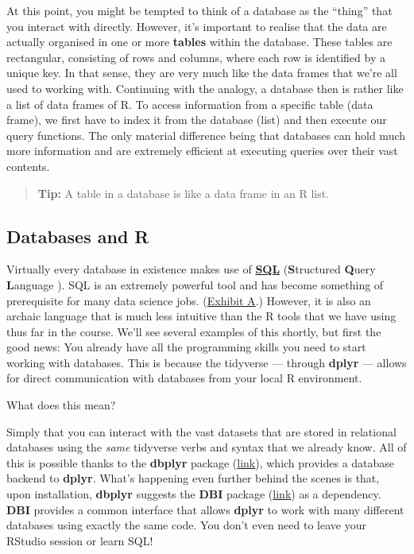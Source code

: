 \documentclass[
]{article}
\begin{document}
At this point, you might be tempted to think of a database as the
``thing'' that you interact with directly. However, it's important to
realise that the data are actually organised in one or more
\textbf{tables} within the database. These tables are rectangular,
consisting of rows and columns, where each row is identified by a unique
key. In that sense, they are very much like the data frames that we're
all used to working with. Continuing with the analogy, a database then
is rather like a list of data frames of R. To access information from a
specific table (data frame), we first have to index it from the database
(list) and then execute our query functions. The only material
difference being that databases can hold much more information and are
extremely efficient at executing queries over their vast contents.

\begin{quote}
\textbf{Tip:} A table in a database is like a data frame in an R list.
\end{quote}

\hypertarget{databases-and-r}{%
\subsection{Databases and R}\label{databases-and-r}}

Virtually every database in existence makes use of
\href{https://en.wikipedia.org/wiki/SQL}{\textbf{SQL}}
(\textbf{S}tructured \textbf{Q}uery \textbf{L}anguage ). SQL is an
extremely powerful tool and has become something of prerequisite for
many data science jobs.
(\href{https://raw.githack.com/uo-ec607/lectures/master/01-intro/01-Intro.html\#whyr}{Exhibit
A}.) However, it is also an archaic language that is much less intuitive
than the R tools that we have using thus far in the course. We'll see
several examples of this shortly, but first the good news: You already
have all the programming skills you need to start working with
databases. This is because the tidyverse --- through \textbf{dplyr} ---
allows for direct communication with databases from your local R
environment.

What does this mean?

Simply that you can interact with the vast datasets that are stored in
relational databases using the \emph{same} tidyverse verbs and syntax
that we already know. All of this is possible thanks to the
\textbf{dbplyr} package (\href{https://dbplyr.tidyverse.org/}{link}),
which provides a database backend to \textbf{dplyr}. What's happening
even further behind the scenes is that, upon installation,
\textbf{dbplyr} suggests the \textbf{DBI} package
(\href{https://db.rstudio.com/dbi}{link}) as a dependency. \textbf{DBI}
provides a common interface that allows \textbf{dplyr} to work with many
different databases using exactly the same code. You don't even need to
leave your RStudio session or learn SQL!
\end{document}
